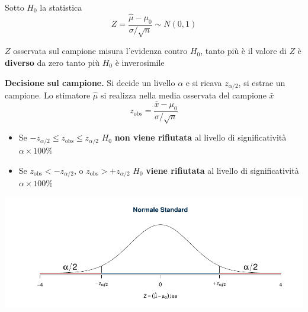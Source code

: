 \documentclass[
  11pt,
]{book}
\providecommand{\tightlist}{%
  \setlength{\itemsep}{0pt}\setlength{\parskip}{0pt}}
\theoremstyle{mytheoremstyle}
\theoremstyle{mydefstyle}
\begin{document}
Sotto \(H_0\) la statistica
\[Z=\frac{\hat\mu-\mu_0}{\sigma/\sqrt n}\sim N(0,1)\]

\(Z\) osservata sul campione misura l'evidenza contro \(H_0\), tanto più è
il valore di \(Z\) è \textbf{diverso} da zero tanto più \(H_0\) è inverosimile

\begin{info}

\textbf{Decisione sul campione.} Si decide un livello \(\alpha\) e si ricava
\(z_{\alpha/2}\), si estrae un campione. Lo stimatore \(\hat\mu\) si
realizza nella media osservata del campione \(\bar x\)
\[z_{\text{obs}}=\frac{\bar x -\mu_0}{\sigma/\sqrt n}\]

\begin{itemize}
\tightlist
\item
  Se \(-z_{\alpha/2}\leq z_{\text{obs}}\leq z_{\alpha/2}\) \(H_0\) \textbf{non
  viene rifiutata} al livello di significatività \(\alpha\times100\%\)
\item
  Se \(z_{\text{obs}}<-z_{\alpha/2}\), o \(z_{\text{obs}}>+z_{\alpha/2}\)
  \(H_0\) \textbf{viene rifiutata} al livello di significatività
  \(\alpha\times100\%\)
\end{itemize}

\begin{center}\includegraphics{Appunti_di_Statistica_2025_files/figure-latex/15-test-mu-pi-19-1} \end{center}

\end{info}
\end{document}
